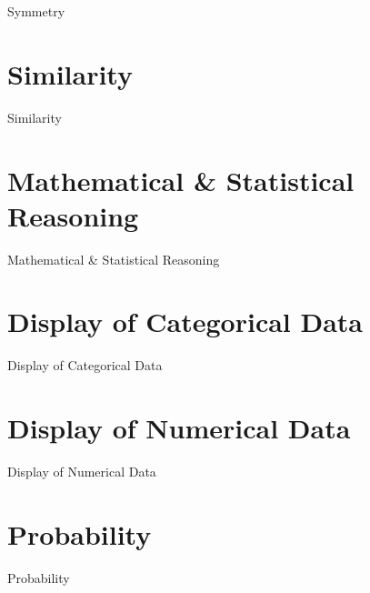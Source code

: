 Symmetry

\section{Similarity}
\label{sec:similarity}

Similarity

\section{Mathematical \& Statistical Reasoning}
\label{sec:mathematical-statistical-reasoning}

Mathematical \& Statistical Reasoning

\section{Display of Categorical Data}
\label{sec:display-of-categorical-data}

Display of Categorical Data

\section{Display of Numerical Data}
\label{sec:display-of-numerical-data}

Display of Numerical Data

\section{Probability}
\label{sec:probability}

Probability

